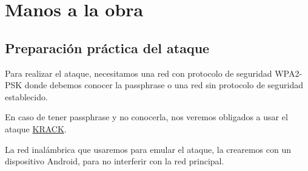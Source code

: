 \chapter{Manos a la obra}
\section{Preparación práctica del ataque} 
Para realizar el ataque, necesitamos una red con protocolo de seguridad WPA2-PSK donde debemos conocer la passphrase o una red sin protocolo de seguridad establecido.

\Nota En caso de tener passphrase y no conocerla, nos veremos obligados a usar el ataque \hyperlink{krack}{KRACK}.


La red inalámbrica que usaremos para emular el ataque, la crearemos con un dispositivo Android, para no interferir con la red principal.

